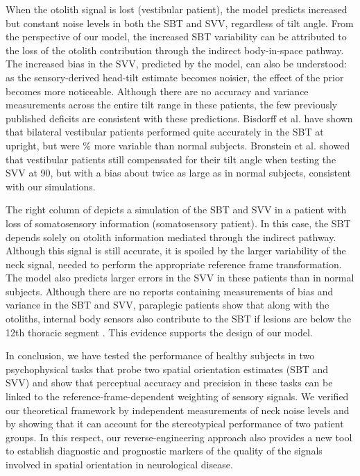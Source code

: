 When the otolith signal is lost (vestibular patient), the model predicts increased but constant noise levels in both the SBT and SVV, regardless of tilt angle. From the perspective of our model, the increased SBT variability can be attributed to the loss of the otolith contribution through the indirect body-in-space pathway. The increased bias in the SVV, predicted by the model, can also be understood: as the sensory-derived head-tilt estimate becomes noisier, the effect of the prior becomes more noticeable. Although there are no accuracy and variance measurements across the entire tilt range in these patients, the few previously published deficits are consistent with these predictions. Bisdorff et al. \citeyear{bisdorff1996} have shown that bilateral vestibular patients performed quite accurately in the SBT at upright, but were \% more variable than normal subjects. Bronstein et al. \citeyear{bronstein1996} showed that vestibular patients still compensated for their tilt angle when testing the SVV at 90\textdegree, but with a bias about twice as large as in normal subjects, consistent with our simulations.

The right column of  depicts a simulation of the SBT and SVV in a patient with loss of somatosensory information (somatosensory patient). In this case, the SBT depends solely on otolith information mediated through the indirect pathway. Although this signal is still accurate, it is spoiled by the larger variability of the neck signal, needed to perform the appropriate reference frame transformation. The model also predicts larger errors in the SVV in these patients than in normal subjects. Although there are no reports containing measurements of bias and variance in the SBT and SVV, paraplegic patients show that along with the otoliths, internal body sensors also contribute to the SBT if lesions are below the 12th thoracic segment \cite{mittelstaedt1997}. This evidence supports the design of our model.

In conclusion, we have tested the performance of healthy subjects in two psychophysical tasks that probe two spatial orientation estimates (SBT and SVV) and show that perceptual accuracy and precision in these tasks can be linked to the reference-frame-dependent weighting of sensory signals. We verified our theoretical framework by independent measurements of neck noise levels and by showing that it can account for the stereotypical performance of two patient groups. In this respect, our reverse-engineering approach also provides a new tool to establish diagnostic and prognostic markers of the quality of the signals involved in spatial orientation in neurological disease.


